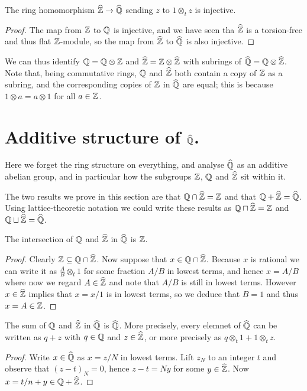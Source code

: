 \begin{lemma}
    \label{QHat.injective_zHat}
    \leanok
    The ring homomorphism $\widehat{\mathbb{Z}}\to\widehat{\mathbb{Q}}$ sending 
    $z$ to $1\otimes_t z$ is injective.
\end{lemma}
\begin{proof} 
    The map from $\mathbb{Z}$ to $\mathbb{Q}$ is injective, and we have seen
    tha $\widehat{\mathbb{Z}}$ is a torsion-free and thus flat $\mathbb{Z}$-module,
    so the map from $\widehat{\mathbb{Z}}$ to $\widehat{\mathbb{Q}}$ is also injective.
\end{proof}

We can thus identify $\mathbb{Q}=\mathbb{Q}\otimes\mathbb{Z}$ and $\widehat{\mathbb{Z}}=\mathbb{Z}\otimes\widehat{\mathbb{Z}}$ with subrings of $\widehat{\mathbb{Q}}=\mathbb{Q}\otimes\widehat{\mathbb{Z}}$.
Note that, being commutative rings, $\mathbb{Q}$ and $\widehat{\mathbb{Z}}$ both contain a copy of $\mathbb{Z}$ as a subring, and
the corresponding copies of $\mathbb{Z}$ in $\widehat{\mathbb{Q}}$ are equal; this is because $1\otimes a=a\otimes 1$
for all $a\in\mathbb{Z}$.

\section{Additive structure of $\widehat{\mathbb{Q}}$.}

Here we forget the ring structure on everything, and analyse $\widehat{\mathbb{Q}}$ as an additive
abelian group, and in particular how the subgroups $\mathbb{Z}$, $\mathbb{Q}$ and $\widehat{\mathbb{Z}}$ sit within it.

The two results we prove in this section are that $\mathbb{Q}\cap\widehat{\mathbb{Z}}=\mathbb{Z}$ and
that $\mathbb{Q}+\widehat{\mathbb{Z}}=\widehat{\mathbb{Q}}$. Using lattice-theoretic notation we could write
these results as $\mathbb{Q}\sqcap\widehat{\mathbb{Z}}=\mathbb{Z}$ and$\mathbb{Q}\sqcup\widehat{\mathbb{Z}}=\widehat{\mathbb{Q}}$.

\begin{lemma}
    \label{Qhat.rat_meet_zHat} 
    The intersection of $\mathbb{Q}$ and $\widehat{\mathbb{Z}}$ in $\widehat{\mathbb{Q}}$ is $\mathbb{Z}$.
\end{lemma}
\begin{proof}
    Clearly $\mathbb{Z}\subseteq\mathbb{Q}\cap\widehat{\mathbb{Z}}$. Now suppose that $x\in\mathbb{Q}\cap\widehat{\mathbb{Z}}$.
    Because $x$ is rational we can write it as $\frac{A}{B}\otimes_t1$ for some
    fraction $A/B$ in lowest terms, and hence $x=A/B$ where now we regard $A\in\widehat{\mathbb{Z}}$
    and note that $A/B$ is still in lowest terms. However $x\in\widehat{\mathbb{Z}}$ implies that 
    $x=x/1$ is in lowest terms, so we deduce that $B=1$ and thus $x=A\in\mathbb{Z}$.
\end{proof}

\begin{lemma}
    \label{QHat.rat_join_zHat}
    The sum of $\mathbb{Q}$ and $\widehat{\mathbb{Z}}$ in $\widehat{\mathbb{Q}}$ is $\widehat{\mathbb{Q}}$.
    More precisely, every elemnet of $\widehat{\mathbb{Q}}$ can be written as $q+z$ with $q\in\mathbb{Q}$ and $z\in\widehat{\mathbb{Z}}$, 
    or more precisely as $q\otimes_t 1+1\otimes_t z$.
\end{lemma}
\begin{proof}
    Write $x\in\widehat{\mathbb{Q}}$ as $x=z/N$ in lowest terms. Lift $z_N$ to an integer $t$ and observe
    that $(z-t)_N=0$, hence $z-t=Ny$ for some $y\in\widehat{\mathbb{Z}}$. Now $x=t/n+y\in\mathbb{Q}+\widehat{\mathbb{Z}}$.
\end{proof}



